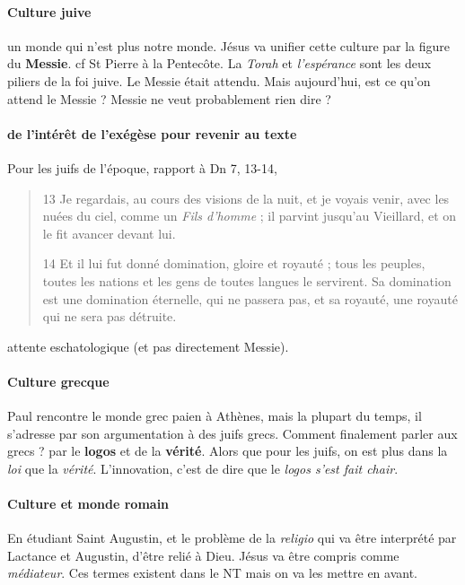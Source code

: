 \paragraph{Culture juive} un monde qui n'est plus notre monde. Jésus va unifier cette culture par la figure du \textbf{Messie}. cf St Pierre à la Pentecôte. La \textit{Torah} et \textit{l'espérance} sont les deux piliers de la foi juive. Le Messie était attendu. Mais aujourd'hui, est ce qu'on attend le Messie ? Messie ne veut probablement rien dire ? 

\paragraph{de l'intérêt de l'exégèse pour revenir au texte}
\begin{Ex}
Pour les juifs de l'époque, rapport à Dn 7, 13-14, 
\begin{quote}
    13 Je regardais, au cours des visions de la nuit, et je voyais venir, avec les nuées du ciel, comme un \textit{Fils d’homme} ; il parvint jusqu’au Vieillard, et on le fit avancer devant lui.

14 Et il lui fut donné domination, gloire et royauté ; tous les peuples, toutes les nations et les gens de toutes langues le servirent. Sa domination est une domination éternelle, qui ne passera pas, et sa royauté, une royauté qui ne sera pas détruite.
\end{quote}
attente eschatologique (et pas directement Messie).  
\end{Ex}

\paragraph{Culture grecque} Paul rencontre le monde grec paien à Athènes, mais la plupart du temps, il s'adresse par son argumentation à des juifs grecs. 
Comment finalement parler aux grecs ? par le \textbf{logos} et de la \textbf{vérité}. Alors que pour les juifs, on est plus dans la \textit{loi} que la \textit{vérité}. L'innovation, c'est de dire que le \textit{logos s'est fait chair}.

\paragraph{Culture et monde romain} En étudiant Saint Augustin, et le problème de la \textit{religio} qui va être interprété par Lactance et Augustin, d'être relié à Dieu. Jésus va être compris comme \textit{médiateur}. Ces termes existent dans le NT mais on va les mettre en avant. 

